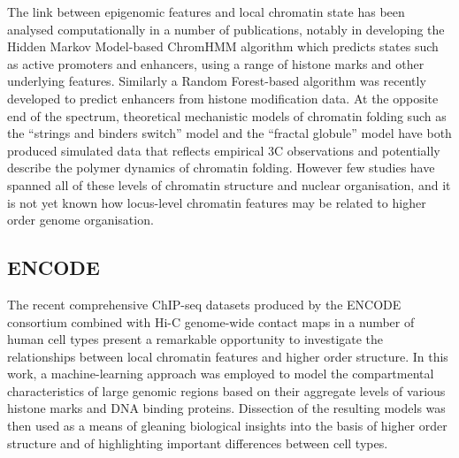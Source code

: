 \documentclass[a4paper,10pt,oneside]{book}
\begin{document}
The link between epigenomic features and local chromatin state has been
analysed computationally in a number of publications, notably in
developing the
Hidden Markov Model-based ChromHMM\cite{Ernst2012} algorithm which predicts states such as active promoters and enhancers, using a
range of histone marks and other underlying features.\cite{Ernst2011} Similarly a Random Forest-based
algorithm was recently developed to predict enhancers from histone
modification data.\cite{Rajagopal2013} At the opposite end of the
spectrum, theoretical mechanistic models of chromatin folding such as the
``strings and binders switch'' model\cite{Barbieri2012} and the ``fractal
globule'' model\cite{Lieberman2011, Mirny2011, Grosberg1988a} have both produced simulated data
that reflects empirical 3C observations and potentially describe the polymer
dynamics of chromatin folding. However few studies have spanned all of
these levels of chromatin structure and nuclear organisation, and it is not yet known how locus-level chromatin features may
be related to higher order genome organisation. \\

\subsection{ENCODE}

The recent comprehensive ChIP-seq datasets
produced by the ENCODE consortium\cite{Dunham2012} combined with Hi-C
genome-wide contact maps in a number of human cell
types\cite{Dixon2012, Lieberman2011, Kalhor2012} present a remarkable
opportunity to investigate the relationships between local
chromatin features and higher order structure. In this work, a
machine-learning approach was employed to model the
compartmental characteristics of large genomic regions based on their
aggregate levels of various histone marks and DNA binding
proteins. Dissection of the resulting models was then used as a
means of gleaning biological insights into the basis of higher order
structure and of highlighting important differences between cell types.



\begin{small}

\end{small}
\end{document}
